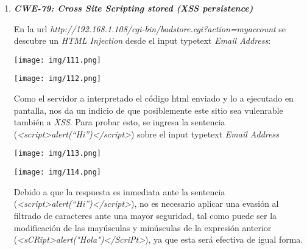 \documentclass[12pt,oneside,a4paper]{book}
\begin{document}
\begin{enumerate}

\item 	\textbf{\textit{CWE-79: Cross Site Scripting stored (XSS persistence)}}

\vspace{1em}

\hspace{20pt}
En la url \textit{http://192.168.1.108/cgi-bin/badstore.cgi?action=myaccount} se descubre un \textit{HTML Injection} desde el input typetext \textit{Email Address}:

\vspace{1em}

\begin{center}
    \texttt{[image: img/111.png]}
\end{center}

\vspace{1em}

\begin{center}
    \texttt{[image: img/112.png]}
\end{center}

\vspace{1em}

\hspace{20pt}
Como el servidor a interpretado el código html enviado y lo a ejecutado en pantalla, nos da un indicio de que posiblemente este sitio sea vulenrable también a \textit{XSS}. Para probar esto, se ingresa la sentencia (\textit{<script>alert(``Hi'')</script>}) sobre el input typetext \textit{Email Address}

\vspace{1em}

\begin{center}
    \texttt{[image: img/113.png]}
\end{center}

\vspace{1em}

\begin{center}
    \texttt{[image: img/114.png]}
\end{center}

\vspace{1em}

\hspace{20pt}
Debido a que la respuesta es inmediata ante la sentencia (\textit{<script>alert(``Hi'')</script>}), no es necesario aplicar una evasión al filtrado de caracteres ante una mayor seguridad, tal como puede ser la modificación de las mayúsculas y minúsculas de la expresión anterior (\textit{<sCRipt>alert("Hola")</ScriPt>}), ya que esta será efectiva de igual forma.


\end{enumerate}
\end{document}
